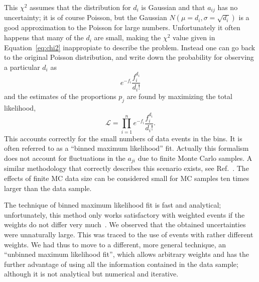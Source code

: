This $\chi^2$ assumes that the distribution for $d_i$ is Gaussian and that $a_{ij}$ has no uncertainty; it is of course Poisson, but the Gaussian $N(\mu = d_i,\sigma = \sqrt{d_i})$ is a good approximation to the Poisson for large numbers. Unfortunately it often happens that many of the $d_i$ are small, making the $\chi^2$ value given in Equation~\ref{eq:chi2} inappropiate to describe the problem.  Instead one can go back to the original Poisson distribution, and write down the probability for observing a particular $d_i$ as
%
\begin{equation}
e^{-f_i} \frac{f_i^{d_i}}{d_i!} 
\end{equation}
%
and the estimates of the proportions $p_j$ are found by maximizing the total likelihood, 
%
\begin{equation}
\mathcal{L} = \prod^n_{i=1} e^{-f_i} \frac{f_i^{d_i}}{d_i!}.
\end{equation}
%
This accounts correctly for the small numbers of data events in the bins.  It is often referred to as a ``binned maximum likelihood'' fit. Actually this formalism does not account for fluctuations in the $a_{ji}$ due to finite Monte Carlo samples. A similar methodology that correctly describes this scenario exists, see Ref.~\cite{Barlow1993219}. The effects of finite MC data size can be considered small for MC samples ten times larger than the data sample. 


The technique of binned maximum likelihood fit is fast and analytical; unfortunately, this method only works satisfactory with weighted events if the weights do not differ very much~\cite{Barlow1993219}.
We observed that the obtained uncertainties were unnaturally large.  This was traced to the use of events with rather different weights.
We had thus to move to a different, more general technique, an ``unbinned maximum likelihood fit'',  which allows arbitrary weights and has the further advantage of using all the information contained in the data sample; although it is not analytical but numerical and iterative. 

